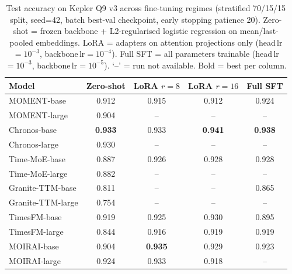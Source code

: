 \begin{table}[h]
\centering
\caption{Test accuracy on Kepler Q9 v3 across fine-tuning regimes (stratified 70/15/15 split, seed=42, batch best-val checkpoint, early stopping patience 20). Zero-shot = frozen backbone + L2-regularised logistic regression on mean/last-pooled embeddings. LoRA = adapters on attention projections only (head\,lr$=10^{-3}$, backbone\,lr$=10^{-4}$). Full SFT = all parameters trainable (head\,lr$=10^{-3}$, backbone\,lr$=10^{-5}$). `--' = run not available. Bold = best per column.}
\label{tab:kepler_q9v3_ft_grid}
\begin{tabular}{lcccc}
\toprule
Model & Zero-shot & LoRA $r{=}8$ & LoRA $r{=}16$ & Full SFT \\
\midrule
MOMENT-base & 0.912 & 0.915 & 0.912 & 0.924 \\
MOMENT-large & 0.904 & -- & -- & -- \\
\midrule
Chronos-base & \textbf{0.933} & 0.933 & \textbf{0.941} & \textbf{0.938} \\
Chronos-large & 0.930 & -- & -- & -- \\
\midrule
Time-MoE-base & 0.887 & 0.926 & 0.928 & 0.928 \\
Time-MoE-large & 0.882 & -- & -- & -- \\
\midrule
Granite-TTM-base & 0.811 & -- & -- & 0.865 \\
Granite-TTM-large & 0.754 & -- & -- & -- \\
\midrule
TimesFM-base & 0.919 & 0.925 & 0.930 & 0.895 \\
TimesFM-large & 0.844 & 0.916 & 0.919 & 0.919 \\
\midrule
MOIRAI-base & 0.904 & \textbf{0.935} & 0.929 & 0.923 \\
MOIRAI-large & 0.924 & 0.933 & 0.918 & -- \\
\bottomrule
\end{tabular}
\end{table}